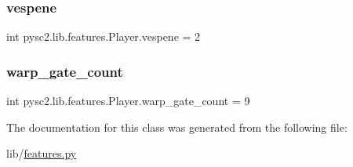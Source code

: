 \subsubsection{\texorpdfstring{vespene}{vespene}}
{\footnotesize\ttfamily int pysc2.\+lib.\+features.\+Player.\+vespene = 2\hspace{0.3cm}{\ttfamily [static]}}

\mbox{\label{classpysc2_1_1lib_1_1features_1_1_player_a15a1f28e1f09c5fdfb6cb322ff5b16e0}} 
\subsubsection{\texorpdfstring{warp\+\_\+gate\+\_\+count}{warp\_gate\_count}}
{\footnotesize\ttfamily int pysc2.\+lib.\+features.\+Player.\+warp\+\_\+gate\+\_\+count = 9\hspace{0.3cm}{\ttfamily [static]}}



The documentation for this class was generated from the following file\+:\begin{DoxyCompactItemize}
\item 
lib/\mbox{\hyperlink{features_8py}{features.\+py}}\end{DoxyCompactItemize}
